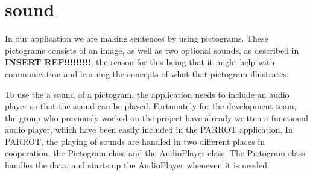 \section{sound}

In our application we are making sentences by using pictograms. These pictograms consists of an image, as well as two optional sounds, as described in \textbf{INSERT REF!!!!!!!!!}, the reason for this being that it might help with communication and learning the concepts of what that pictogram illustrates.\newline

To use the a sound of a pictogram, the application needs to include an audio player so that the sound can be played. Fortunately for the development team, the group who previously worked on the project have already written a functional audio player, which have been easily included in the PARROT application.\newline
In PARROT, the playing of sounds are handled in two different places in cooperation, the Pictogram class and the AudioPlayer class.\newline
The Pictogram class handles the data, and starts up the AudioPlayer wheneven it is needed.\newline

